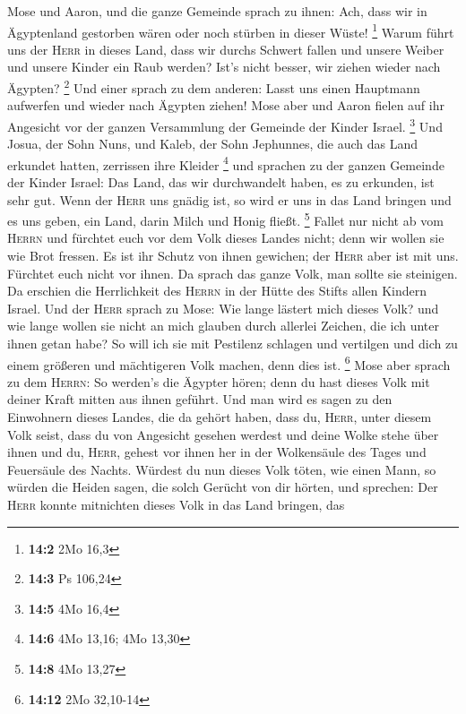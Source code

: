 Mose und Aaron, und die ganze Gemeinde sprach zu ihnen: Ach, dass wir in
Ägyptenland gestorben wären oder noch stürben in dieser Wüste!
\footnote{\textbf{14:2} 2Mo 16,3}  Warum führt uns der
\textsc{Herr} in dieses Land, dass wir durchs Schwert fallen und unsere
Weiber und unsere Kinder ein Raub werden? Ist's nicht besser, wir ziehen
wieder nach Ägypten? \footnote{\textbf{14:3} Ps 106,24} 
Und einer sprach zu dem anderen: Lasst uns einen Hauptmann aufwerfen und
wieder nach Ägypten ziehen!  Mose aber und Aaron fielen
auf ihr Angesicht vor der ganzen Versammlung der Gemeinde der Kinder
Israel. \footnote{\textbf{14:5} 4Mo 16,4}  Und Josua, der
Sohn Nuns, und Kaleb, der Sohn Jephunnes, die auch das Land erkundet
hatten, zerrissen ihre Kleider \footnote{\textbf{14:6} 4Mo 13,16; 4Mo
  13,30}  und sprachen zu der ganzen Gemeinde der Kinder
Israel: Das Land, das wir durchwandelt haben, es zu erkunden, ist sehr
gut.  Wenn der \textsc{Herr} uns gnädig ist, so wird er
uns in das Land bringen und es uns geben, ein Land, darin Milch und
Honig fließt. \footnote{\textbf{14:8} 4Mo 13,27}  Fallet
nur nicht ab vom \textsc{Herrn} und fürchtet euch vor dem Volk dieses
Landes nicht; denn wir wollen sie wie Brot fressen. Es ist ihr Schutz
von ihnen gewichen; der \textsc{Herr} aber ist mit uns. Fürchtet euch
nicht vor ihnen.  Da sprach das ganze Volk, man sollte
sie steinigen. Da erschien die Herrlichkeit des \textsc{Herrn} in der
Hütte des Stifts allen Kindern Israel.  Und der
\textsc{Herr} sprach zu Mose: Wie lange lästert mich dieses Volk? und
wie lange wollen sie nicht an mich glauben durch allerlei Zeichen, die
ich unter ihnen getan habe?  So will ich sie mit
Pestilenz schlagen und vertilgen und dich zu einem größeren und
mächtigeren Volk machen, denn dies ist. \footnote{\textbf{14:12} 2Mo
  32,10-14}  Mose aber sprach zu dem \textsc{Herrn}: So
werden's die Ägypter hören; denn du hast dieses Volk mit deiner Kraft
mitten aus ihnen geführt.  Und man wird es sagen zu den
Einwohnern dieses Landes, die da gehört haben, dass du, \textsc{Herr},
unter diesem Volk seist, dass du von Angesicht gesehen werdest und deine
Wolke stehe über ihnen und du, \textsc{Herr}, gehest vor ihnen her in
der Wolkensäule des Tages und Feuersäule des Nachts. 
Würdest du nun dieses Volk töten, wie einen Mann, so würden die Heiden
sagen, die solch Gerücht von dir hörten, und sprechen: 
Der \textsc{Herr} konnte mitnichten dieses Volk in das Land bringen, das
